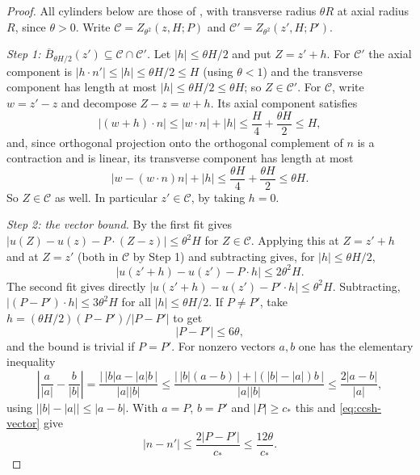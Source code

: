 \begin{proof}
All cylinders below are those of , with transverse radius
$\theta R$ at axial radius $R$, since $\theta>0$. Write
$\mathcal C=Z_{\theta^2}(z,H;P)$ and $\mathcal C'=Z_{\theta^2}(z',H;P')$.

\emph{Step 1: $\overline B_{\theta H/2}(z')\subseteq\mathcal C\cap\mathcal C'$.}
Let $|h|\le\theta H/2$ and put $Z=z'+h$. For $\mathcal C'$ the axial component
is $|h\cdot n'|\le|h|\le\theta H/2\le H$ (using $\theta<1$) and the transverse
component has length at most $|h|\le\theta H/2\le\theta H$; so
$Z\in\mathcal C'$. For $\mathcal C$, write $w=z'-z$ and decompose
$Z-z=w+h$. Its axial component satisfies
\[
  |(w+h)\cdot n|\le|w\cdot n|+|h|\le\frac H4+\frac{\theta H}2\le H,
\]
and, since orthogonal projection onto the orthogonal complement of $n$ is a
contraction and is linear, its transverse component has length at most
\[
  \bigl|w-(w\cdot n)n\bigr|+|h|\le\frac{\theta H}4+\frac{\theta H}2\le\theta H .
\]
So $Z\in\mathcal C$ as well. In particular $z'\in\mathcal C$, by taking $h=0$.

\emph{Step 2: the vector bound.}
By  the first fit gives
$|u(Z)-u(z)-P\cdot(Z-z)|\le\theta^2H$ for $Z\in\mathcal C$. Applying this at
$Z=z'+h$ and at $Z=z'$ (both in $\mathcal C$ by Step 1) and subtracting gives,
for $|h|\le\theta H/2$,
\[
  |u(z'+h)-u(z')-P\cdot h|\le2\theta^2H .
\]
The second fit gives directly $|u(z'+h)-u(z')-P'\cdot h|\le\theta^2H$.
Subtracting, $|(P-P')\cdot h|\le3\theta^2H$ for all $|h|\le\theta H/2$. If
$P\ne P'$, take $h=(\theta H/2)(P-P')/|P-P'|$ to get
\begin{equation}\label{eq:ccsh-vector}
  |P-P'|\le6\theta,
\end{equation}
and the bound is trivial if $P=P'$. For nonzero vectors $a,b$ one has the
elementary inequality
\[
  \left|\frac a{|a|}-\frac b{|b|}\right|
   =\frac{\bigl|\,|b|a-|a|b\,\bigr|}{|a||b|}
   \le\frac{\bigl|\,|b|(a-b)\,\bigr|+\bigl|(|b|-|a|)b\,\bigr|}{|a||b|}
   \le\frac{2|a-b|}{|a|},
\]
using $\bigl||b|-|a|\bigr|\le|a-b|$. With $a=P$, $b=P'$ and $|P|\ge c_*$ this
and \eqref{eq:ccsh-vector} give
\begin{equation}\label{eq:ccsh-dir}
  |n-n'|\le\frac{2|P-P'|}{c_*}\le\frac{12\theta}{c_*}.
\end{equation}


\end{proof}
